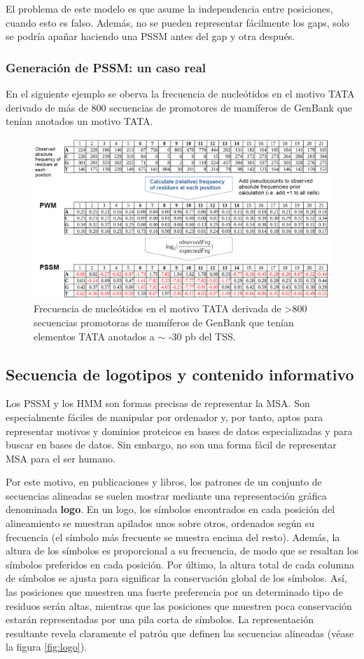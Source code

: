 El problema de este modelo es que asume la independencia entre posiciones, cuando esto es falso. Además, no se pueden representar fácilmente los gaps, solo se podría apañar haciendo una PSSM antes del gap y otra después.

\subsubsection{Generación de PSSM: un caso real}
En el siguiente ejemplo se oberva la frecuencia de nucleótidos en el motivo TATA derivado de más de 800 secuencias de promotores de mamíferos de GenBank que tenían anotados un motivo TATA.

\begin{figure}[htbp]
\centering
\includegraphics[width = \textwidth]{figs/tata.png}
\caption{Frecuencia de nucleótidos en el motivo TATA derivada de >800 secuencias promotoras de mamíferos de GenBank que tenían elementos TATA anotados a $\sim$ -30 pb del TSS.}
\end{figure}

\subsection{Secuencia de logotipos y contenido informativo}
Los PSSM y los HMM son formas precisas de representar la MSA. Son especialmente fáciles de manipular por ordenador y, por tanto, aptos para representar motivos y dominios proteicos en bases de datos especializadas y para buscar en bases de datos. Sin embargo, no son una forma fácil de representar MSA para el ser humano.

Por este motivo, en publicaciones y libros, los patrones de un conjunto de secuencias alineadas se suelen mostrar mediante una representación gráfica denominada \textbf{logo}. En un logo, los símbolos encontrados en cada posición del alineamiento se muestran apilados unos sobre otros, ordenados según su frecuencia (el símbolo más frecuente se muestra encima del resto). Además, la altura de los símbolos es proporcional a su frecuencia, de modo que se resaltan los símbolos preferidos en cada posición. Por último, la altura total de cada columna de símbolos se ajusta para significar la conservación global de los símbolos. Así, las posiciones que muestren una fuerte preferencia por un determinado tipo de residuos serán altas, mientras que las posiciones que muestren poca conservación estarán representadas por una pila corta de símbolos. La representación resultante revela claramente el patrón que definen las secuencias alineadas (véase la figura \ref{fig:logo}).

